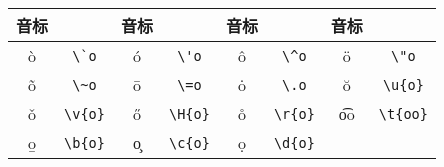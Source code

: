 \begin{table}[H]
\centering
\begin{tabular}{|*{8}{c|}}\hline
音标 &  &音标 &  &音标 & &音标 &  \\
\hline
\`o & \verb|\`o| &
\'o & \verb|\'o| &
\^o & \verb|\^o| &
\"o & \verb|\"o| \\\hline
\~o & \verb|\~o| &
\=o & \verb|\=o| &
\.o & \verb|\.o| &
\u{o} & \verb|\u{o}| \\\hline
\v{o} & \verb|\v{o}| &
\H{o} & \verb|\H{o}| &
\r{o} & \verb|\r{o}| &
\t{oo} & \verb|\t{oo}| \\\hline
\b{o} & \verb|\b{o}| &
\c{o} & \verb|\c{o}| &
\d{o} & \verb|\d{o}| &
& \\\hline
\end{tabular}

\end{table}